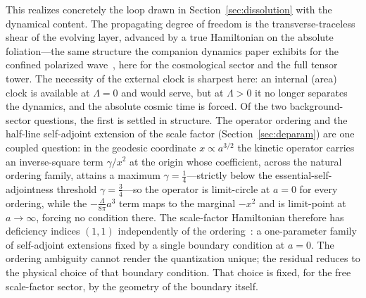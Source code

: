 \documentclass[11pt,a4paper]{article}
\theoremstyle{plain}
\theoremstyle{definition}
\theoremstyle{remark}
\begin{document}
This realizes concretely the loop drawn in Section~\ref{sec:dissolution} with the dynamical content. The propagating degree of freedom is the transverse-traceless shear of the evolving layer, advanced by a true Hamiltonian on the absolute foliation---the same structure the companion dynamics paper exhibits for the confined polarized wave~\cite{JanzenDynamics}, here for the cosmological sector and the full tensor tower. The necessity of the external clock is sharpest here: an internal (area) clock is available at $\Lambda=0$ and would serve, but at $\Lambda>0$ it no longer separates the dynamics, and the absolute cosmic time is forced. Of the two background-sector questions, the first is settled in structure. The operator ordering and the half-line self-adjoint extension of the scale factor (Section~\ref{sec:deparam}) are one coupled question: in the geodesic coordinate $x\propto a^{3/2}$ the kinetic operator carries an inverse-square term $\gamma/x^2$ at the origin whose coefficient, across the natural ordering family, attains a maximum $\gamma=\tfrac14$---strictly below the essential-self-adjointness threshold $\gamma=\tfrac34$---so the operator is limit-circle at $a=0$ for every ordering, while the $-\tfrac{\Lambda}{8\pi}a^3$ term maps to the marginal $-x^2$ and is limit-point at $a\to\infty$, forcing no condition there. The scale-factor Hamiltonian therefore has deficiency indices $(1,1)$ independently of the ordering~\cite{Weyl1910, ReedSimon1975}: a one-parameter family of self-adjoint extensions fixed by a single boundary condition at $a=0$. The ordering ambiguity cannot render the quantization unique; the residual reduces to the physical choice of that boundary condition. That choice is fixed, for the free scale-factor sector, by the geometry of the boundary itself.
\end{document}
